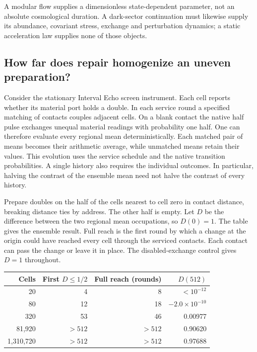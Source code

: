 \documentclass[11pt]{article}
\theoremstyle{remark}
\theoremstyle{plain}
\begin{document}
A modular flow supplies a dimensionless state-dependent parameter, not an
absolute cosmological duration. A dark-sector
continuation must likewise supply its abundance, covariant stress, exchange
and perturbation dynamics; a static acceleration law supplies none of those
objects.

\subsection{How far does repair homogenize an uneven preparation?}

Consider the stationary Interval Echo screen instrument. Each cell reports
whether its material port holds a double. In each service round a specified
matching of contacts couples adjacent cells. On a blank contact the native
half pulse exchanges unequal material readings with probability one half.
One can therefore evaluate every regional mean deterministically. Each
matched pair of means becomes their arithmetic average, while unmatched
means retain their values. This evolution uses the service schedule and
the native transition probabilities. A single history also requires the
individual outcomes. In particular, halving the contrast of the ensemble
mean need not halve the contrast of every history.

Prepare doubles on the half of the cells nearest to cell zero in contact
distance, breaking distance ties by address. The other half is empty.
Let $D$ be the difference between the two regional mean occupations, so
$D(0)=1$. The table gives the ensemble result. Full reach is the first
round by which a change at the origin could have reached every cell
through the serviced contacts. Each contact can pass the change or leave
it in place. The disabled-exchange control gives $D=1$ throughout.

\begin{center}
\begin{tabular}{r r r r}
\hline
Cells & First $D\leq 1/2$ & Full reach (rounds) & $D(512)$\\
\hline
20 & 4 & 8 & $<10^{-12}$\\
80 & 12 & 18 & $-2.0\times10^{-10}$\\
320 & 53 & 46 & 0.00977\\
81,920 & $>512$ & $>512$ & 0.90620\\
1,310,720 & $>512$ & $>512$ & 0.97688\\
\hline
\end{tabular}
\end{center}
\end{document}
